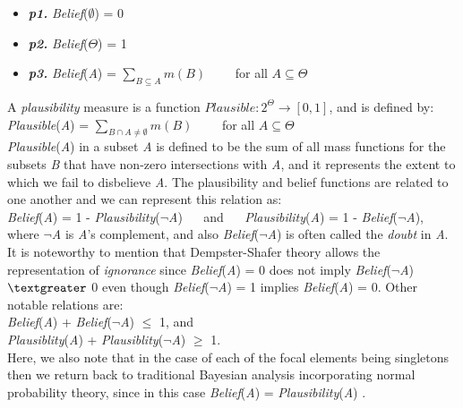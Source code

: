 \documentclass[11pt]{article}
\begin{document}
\begin{itemize}
	\item[]\textit{\textbf{p1.}} \textit{Belief}($\emptyset$) = 0
	\item[]\textit{\textbf{p2.}} \textit{Belief}($\Theta$) = 1
	\item[]\textit{\textbf{p3.}} \textit{Belief}(\textit{A}) = $\sum\limits_{B
	\subseteq A}m(B)\qquad$ for all $A \subseteq \Theta$
\end{itemize}

A \textit{plausibility} measure is a function
$Plausible:2^\Theta\rightarrow[0,1]$, and is defined by:\\

\textit{Plausible}(\textit{A}) = $\sum\limits_{B \cap A \neq
\emptyset}m(B)\qquad$ for all $A \subseteq \Theta$\\

\noindent \textit{Plausible}(\textit{A}) in a subset \textit{A} is defined to
be the sum of all mass functions for the subsets \textit{B} that have non-zero
intersections with \textit{A}, and it represents the extent to which we fail to
disbelieve \textit{A}. The plausibility and belief functions are related to one
another and we can represent this relation as:\\

\textit{Belief}(\textit{A}) = 1 - \textit{Plausibility}(\textit{$\neg$A}) $\quad$
and $\quad$ \textit{Plausibility}(\textit{A}) = 1 -
\textit{Belief}(\textit{$\neg$A}),\\

\noindent where \textit{$\neg$A} is \textit{A}'s complement, and also
\textit{Belief}(\textit{$\neg$A}) is often called the \textit{doubt} in \textit{A}.
It is noteworthy to mention that Dempster-Shafer theory allows the
representation of \textit{ignorance} since \textit{Belief}(\textit{A}) = 0 does not
imply \textit{Belief}(\textit{$\neg$A}) $\textgreater$ 0 even though
\textit{Belief}(\textit{$\neg$A}) = 1 implies \textit{Belief}(\textit{A}) = 0. Other
notable relations are:\\

\noindent\textit{Belief}(\textit{A}) + \textit{Belief}(\textit{$\neg$A}) $\leq$ 1,
and\\

\noindent\textit{Plausiblity}(\textit{A}) +
\textit{Plausiblity}(\textit{$\neg$A}) $\geq$ 1.\\

Here, we also note that in the case of each of the focal elements being
singletons then we return back to traditional Bayesian analysis incorporating
normal probability theory, since in this case \textit{Belief}(\textit{A}) =
\textit{Plausibility}(\textit{A}) \cite{beynon:dst-alternative-decision}.
\end{document}
